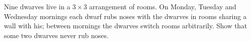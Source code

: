 Nine dwarves live in a $3\times3$ arrangement of rooms. On Monday, Tuesday and Wednesday mornings each dwarf rubs noses with the dwarves in rooms sharing a wall with his; between mornings the dwarves switch rooms arbitrarily. Show that some two dwarves never rub noses.
